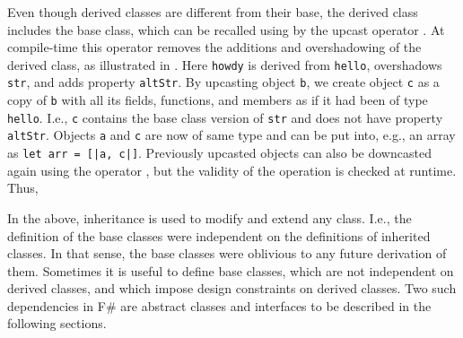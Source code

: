 Even though derived classes are different from their base, the derived class includes the base class, which can be recalled using  by the upcast operator \idx[:>@\lstinline{:>}]{\lexeme{:>}}. At compile-time this operator removes the additions and overshadowing of the derived class, as illustrated in . 
%
%
Here \lstinline{howdy} is derived from \lstinline{hello}, overshadows \lstinline{str}, and adds property \lstinline{altStr}. By upcasting object \lstinline{b}, we create object \lstinline{c} as a copy of \lstinline{b} with all its fields, functions, and members as if it had been of type \lstinline{hello}. I.e., \lstinline{c} contains the base class version of \lstinline{str} and does not have property \lstinline{altStr}. Objects \lstinline{a} and \lstinline{c} are now of same type and can be put into, e.g., an array as \lstinline{let arr = [|a, c|]}. Previously upcasted objects can also be downcasted again using the  operator , but the validity of the operation is checked at runtime. Thus, 

In the above, inheritance is used to modify and extend any class. I.e., the definition of the base classes were independent on the definitions of inherited classes. In that sense, the base classes were oblivious to any future derivation of them. Sometimes it is useful to define base classes, which are not independent on derived classes, and which impose design constraints on derived classes. Two such dependencies in F\# are abstract classes and interfaces to be described in the following sections.

